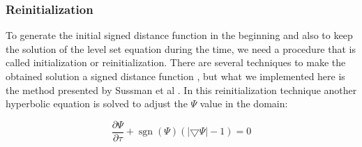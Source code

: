 \documentclass[letterpaper,10pt]{article}
\DeclareMathOperator{\sgn}{sgn}
\begin{document}
%
%
%
% 
% 
%         

\subsubsection{Reinitialization} \label{reinitialization}

To generate the initial signed distance function in the beginning and also to keep the solution of the level set equation during 
the time, we need a procedure that is called initialization or reinitialization. There are several techniques to make the obtained 
solution a signed distance function \cite{Osher1988}, but what we implemented here is the method presented by 
Sussman et al \cite{Sussman1994}. In this reinitialization technique another hyperbolic equation is solved to adjust the $\varPsi$ value 
in the domain:

\begin{equation}\label{initializationeq}
 \frac{\partial \varPsi}{\partial \tau} + \sgn (\varPsi) (|\bigtriangledown \varPsi| - 1)= 0 
\end{equation}
\end{document}

